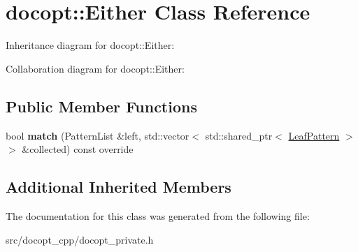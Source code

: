 \hypertarget{classdocopt_1_1Either}{}\section{docopt\+:\+:Either Class Reference}
\label{classdocopt_1_1Either}


Inheritance diagram for docopt\+:\+:Either\+:


Collaboration diagram for docopt\+:\+:Either\+:
\subsection*{Public Member Functions}
\begin{DoxyCompactItemize}
\item 
\mbox{\label{classdocopt_1_1Either_aedbb09ed31a6c321d274040e3179d449}} 
bool {\bfseries match} (Pattern\+List \&left, std\+::vector$<$ std\+::shared\+\_\+ptr$<$ \hyperlink{classdocopt_1_1LeafPattern}{Leaf\+Pattern} $>$$>$ \&collected) const override
\end{DoxyCompactItemize}
\subsection*{Additional Inherited Members}


The documentation for this class was generated from the following file\+:\begin{DoxyCompactItemize}
\item 
src/docopt\+\_\+cpp/docopt\+\_\+private.\+h\end{DoxyCompactItemize}
